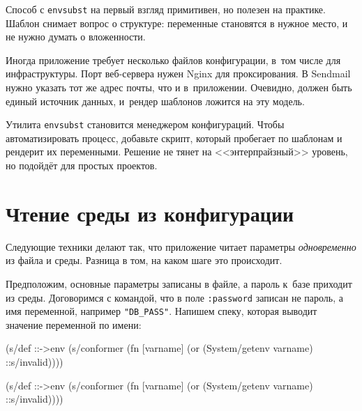 \else

\begin{english}
\end{english}

\fi

Способ с \verb|envsubst| на первый взгляд примитивен, но полезен на
практике. Шаблон снимает вопрос о структуре: переменные становятся в нужное
место, и не нужно думать о вложенности.

Иногда приложение требует несколько файлов конфигурации, в~том числе для
инфраструктуры. Порт веб-сервера нужен Nginx для проксирования. В Sendmail нужно
указать тот же адрес почты, что и в~приложении. Очевидно, должен быть единый
источник данных, и~рендер шаблонов ложится на эту модель.

Утилита \verb|envsubst| становится менеджером конфигураций. Чтобы
автоматизировать процесс, добавьте скрипт, который пробегает по шаблонам и
рендерит их переменными. Решение не тянет на <<энтерпрайзный>> уровень, но
подойдёт для простых проектов.

\section{Чтение среды из конфигурации}

Следующие техники делают так, что приложение читает параметры
\emph{одновременно} из файла и среды. Разница в том, на каком шаге это
происходит.

Предположим, основные параметры записаны в файле, а пароль к~базе приходит из
среды. Договоримся с командой, что в поле \verb|:password| записан не пароль,
а имя переменной, например \verb|"DB_PASS"|. Напишем спеку, которая выводит
значение переменной по имени:

\ifx\devicetype\mobile

\begin{english}
  \begin{clojure}
(s/def ::->env
  (s/conformer
   (fn [varname]
     (or (System/getenv varname)
         ::s/invalid))))
  \end{clojure}
\end{english}

\else

\begin{english}
  \begin{clojure}
(s/def ::->env
  (s/conformer
   (fn [varname]
     (or (System/getenv varname) ::s/invalid))))
  \end{clojure}
\end{english}

